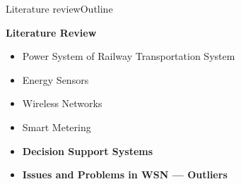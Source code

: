 		
		



\begin{frame}{Literature review}{Outline}
	\begin{block}{\textbf{Literature Review}}
		\begin{itemize}
			\item Power System of Railway Transportation System
			\item Energy Sensors
			\item Wireless Networks
			\item Smart Metering
			\item \textbf{Decision Support Systems}
			\item \textbf{Issues and Problems in WSN --- Outliers}
		\end{itemize}
	\end{block}
\end{frame}



	
